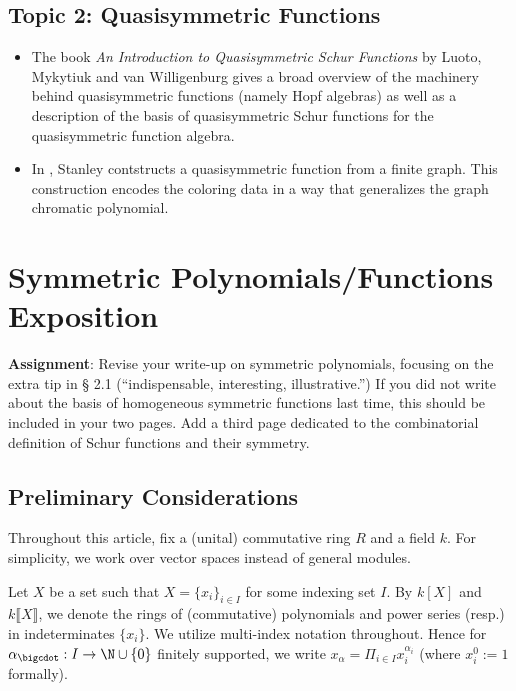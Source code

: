 \documentclass[12pt]{article}
\begin{document}
\subsection*{Topic 2: Quasisymmetric Functions}
\begin{itemize}
  \item The book \textit{An Introduction to Quasisymmetric {S}chur Functions} \cite{qsymschur} by Luoto, Mykytiuk and van Willigenburg gives a broad overview of the machinery behind quasisymmetric functions (namely Hopf algebras) as well as a description of the basis of quasisymmetric {S}chur functions for the quasisymmetric function algebra.
  \item In \cite{stanley:95}, Stanley contstructs a quasisymmetric function from a finite graph. This construction encodes the coloring data in a way that generalizes the graph chromatic polynomial. 
\end{itemize}



\newpage

\section{Symmetric Polynomials/Functions Exposition}

\textbf{Assignment}: Revise your write-up on symmetric polynomials, focusing on the extra tip
in § 2.1 (``indispensable, interesting, illustrative.'') If you did not write about the basis of homogeneous symmetric
functions last time, this should be included in your two pages. Add a third
page dedicated to the combinatorial definition of Schur functions and their
symmetry.

\subsection*{Preliminary Considerations} 
Throughout this article, fix a (unital) commutative ring $ R $ and a field $ k $. For simplicity, we work over vector spaces instead of general modules.

\begin{notation*}
  Let $ X $ be a set such that $ X = \{x_{i}\}_{i\in I} $ for some indexing set $ I $. By $ k[X] $ and $ k\llbracket X \rrbracket $, we denote the rings of (commutative) polynomials and power series (resp.) in indeterminates $ \{x_{i}\} $. We utilize multi-index notation throughout. Hence for $ \alpha_{\bigcdot}:I\to \N\cup\{0\} $ finitely supported, we write $ x_{\alpha} = \Pi_{i\in I}x_{i}^{\alpha_{i}} $ (where $ x_{i}^0 := 1 $ formally).
\end{notation*}
\end{document}
